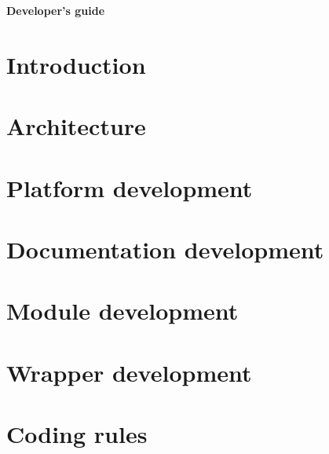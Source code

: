 \documentclass[a4paper,11pt]{article}
\begin{document}
\begin{titlepage}
  \vspace*{2cm}
  \begin{center}
    {\huge \bf Developer's guide}
    
  \end{center}

\end{titlepage}

\newpage

% 

\cleardoublepage
\tableofcontents
\cleardoublepage
\listoffigures
\cleardoublepage
\listoftables
\cleardoublepage

\section*{Introduction}

\cleardoublepage

\section{Architecture}

\cleardoublepage

\section{Platform development}

\cleardoublepage

\section{Documentation development}

\cleardoublepage

\section{Module development}

\cleardoublepage

\section{Wrapper development}

\cleardoublepage

\appendix

\section{Coding rules}

\cleardoublepage
\end{document}

